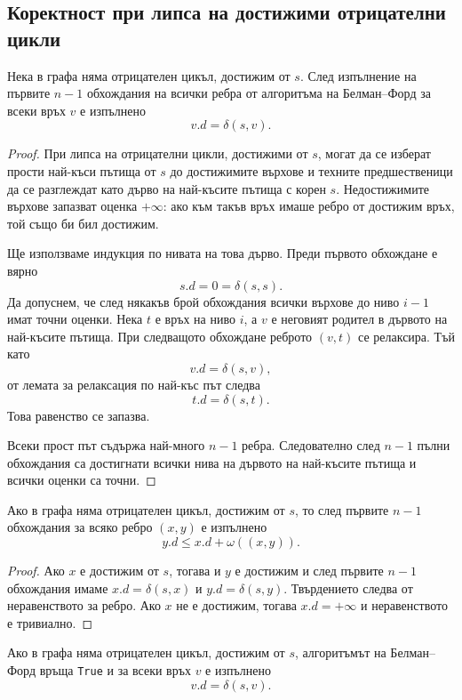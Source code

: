 \subsection{Коректност при липса на достижими отрицателни цикли}\label{s:8.5.2}

\begin{lem}
Нека в графа няма отрицателен цикъл, достижим от $s$. След изпълнение на първите $n-1$ обхождания на всички ребра от алгоритъма на Белман--Форд за всеки връх $v$ е изпълнено
\[
v.d=\delta(s,v).
\]
\end{lem}

\begin{proof}
При липса на отрицателни цикли, достижими от $s$, могат да се изберат прости най-къси пътища от $s$ до достижимите върхове и техните предшественици да се разглеждат като дърво на най-късите пътища с корен $s$. Недостижимите върхове запазват оценка $+\infty$: ако към такъв връх имаше ребро от достижим връх, той също би бил достижим.

Ще използваме индукция по нивата на това дърво. Преди първото обхождане е вярно
\[
s.d=0=\delta(s,s).
\]
Да допуснем, че след някакъв брой обхождания всички върхове до ниво $i-1$ имат точни оценки. Нека $t$ е връх на ниво $i$, а $v$ е неговият родител в дървото на най-късите пътища. При следващото обхождане реброто $(v,t)$ се релаксира. Тъй като
\[
v.d=\delta(s,v),
\]
от лемата за релаксация по най-къс път следва
\[
t.d=\delta(s,t).
\]
Това равенство се запазва.

Всеки прост път съдържа най-много $n-1$ ребра. Следователно след $n-1$ пълни обхождания са достигнати всички нива на дървото на най-късите пътища и всички оценки са точни.
\end{proof}

\begin{lem}
Ако в графа няма отрицателен цикъл, достижим от $s$, то след първите $n-1$ обхождания за всяко ребро $(x,y)$ е изпълнено
\[
y.d\leq x.d+\omega((x,y)).
\]
\end{lem}

\begin{proof}
Ако $x$ е достижим от $s$, тогава и $y$ е достижим и след първите $n-1$ обхождания имаме $x.d=\delta(s,x)$ и $y.d=\delta(s,y)$. Твърдението следва от неравенството за ребро. Ако $x$ не е достижим, тогава $x.d=+\infty$ и неравенството е тривиално.
\end{proof}

\begin{thm}
Ако в графа няма отрицателен цикъл, достижим от $s$, алгоритъмът на Белман--Форд връща \texttt{True} и за всеки връх $v$ е изпълнено
\[
v.d=\delta(s,v).
\]
\end{thm}

